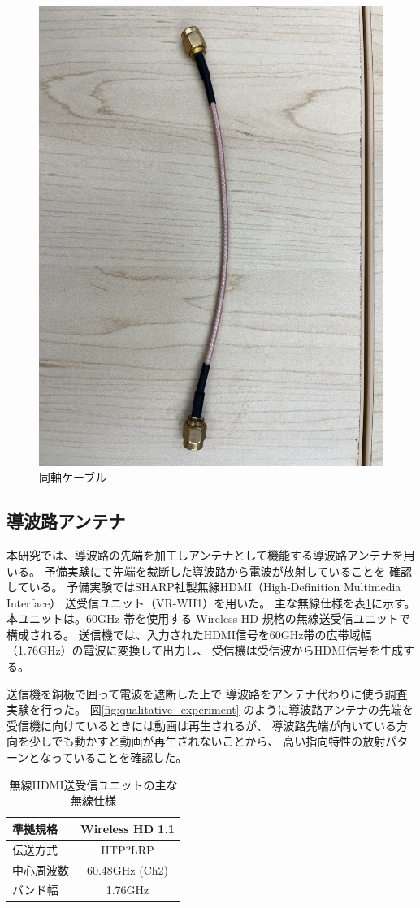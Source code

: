 \documentclass[technicalreport]{ieicej}
\begin{document}
\begin{figure}[tb]
  \begin{center}
    \includegraphics[bb=0.000000 0.000000 593.264305 791.019074, width=0.5\linewidth]{img/sma_cables.pdf}
    \caption{同軸ケーブル}
    \label{fig:sma_cables}
  \end{center}
\end{figure}

\subsection{導波路アンテナ}

本研究では、導波路の先端を加工しアンテナとして機能する導波路アンテナを用いる。
予備実験にて先端を裁断した導波路から電波が放射していることを
確認している。
予備実験ではSHARP社製無線HDMI（High-Definition Multimedia Interface）
送受信ユニット（VR-WH1）を用いた。
主な無線仕様を表\ref{table:wireless}に示す。
本ユニットは。60GHz 帯を使用する Wireless HD 規格の無線送受信ユニットで構成される。
送信機では、入力されたHDMI信号を60GHz帯の広帯域幅（1.76GHz）の電波に変換して出力し、
受信機は受信波からHDMI信号を生成する。

送信機を銅板で囲って電波を遮断した上で
導波路をアンテナ代わりに使う調査実験を行った。
図\ref{fig:qualitative_experiment}
のように導波路アンテナの先端を
受信機に向けているときには動画は再生されるが、
導波路先端が向いている方向を少しでも動かすと動画が再生されないことから、
高い指向特性の放射パターンとなっていることを確認した。

\begin{table}[tb]
  \centering
  \label{table:wireless}
  \caption{無線HDMI送受信ユニットの主な無線仕様}
  \begin{tabular}{lc}
    \hline
    準拠規格 & Wireless HD 1.1 \\
    \hline\hline
    伝送方式 & HTP?LRP \\
    \hline
    中心周波数 & 60.48GHz (Ch2) \\
    \hline
    バンド幅 & 1.76GHz \\
    \hline
  \end{tabular}
 \end{table}
\end{document}
